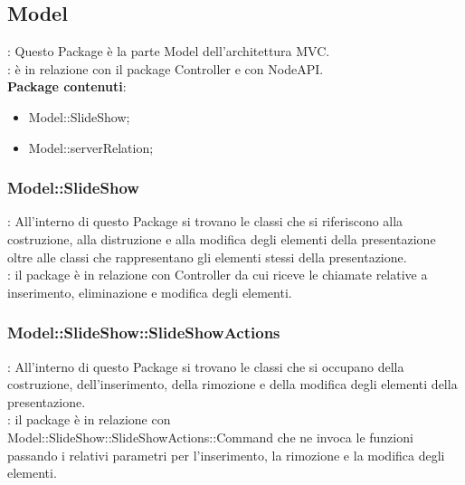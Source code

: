 \subsection{Model}{
	\textbf{\tipo}: Questo Package è la parte Model dell'architettura MVC.\\
	\textbf{\relaz}: è in relazione con il package Controller e con NodeAPI.\\
	\textbf{Package contenuti}: 
	\begin{itemize}
	\item Model::\-SlideShow;
    \item Model::\-serverRelation;
	\end{itemize}
}
\subsubsection{Model::\-SlideShow}{
	\textbf{\tipo}: All’interno di questo Package si trovano le classi che si riferiscono alla costruzione, alla distruzione e alla modifica degli elementi della presentazione oltre alle classi che rappresentano gli elementi stessi della presentazione.\\
    \textbf{\relaz}: il package è in relazione con Controller da cui riceve le chiamate relative a inserimento, eliminazione e modifica degli elementi.
}
\subsubsection{Model::\-SlideShow::\-SlideShowActions}{
	\textbf{\tipo}: All’interno di questo Package si trovano le classi che si occupano della costruzione, dell'inserimento, della rimozione e della modifica degli elementi della presentazione.\\
    \textbf{\relaz}: il package è in relazione con\\ Model::\-SlideShow::\-SlideShowActions::\-Command che ne invoca le funzioni passando i relativi parametri per l'inserimento, la rimozione e la modifica degli elementi.
}

